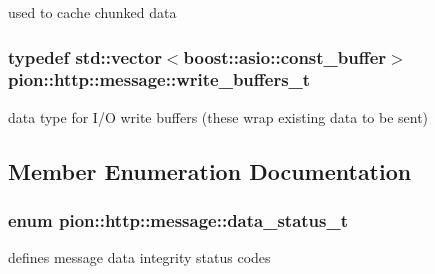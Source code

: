 used to cache chunked data 

\hypertarget{classpion_1_1http_1_1message_aacf9a6a7677c32e4ab764ac97d0b5e7b}{
\subsubsection[{write\-\_\-buffers\-\_\-t}]{\setlength{\rightskip}{0pt plus 5cm}typedef std\-::vector$<$boost\-::asio\-::const\-\_\-buffer$>$ {\bf pion\-::http\-::message\-::write\-\_\-buffers\-\_\-t}}}\label{classpion_1_1http_1_1message_aacf9a6a7677c32e4ab764ac97d0b5e7b}


data type for I/\-O write buffers (these wrap existing data to be sent) 



\subsection{Member Enumeration Documentation}
\hypertarget{classpion_1_1http_1_1message_ab71e06f72cacb4945dbf84663b0420e9}{
\subsubsection[{data\-\_\-status\-\_\-t}]{\setlength{\rightskip}{0pt plus 5cm}enum {\bf pion\-::http\-::message\-::data\-\_\-status\-\_\-t}}}\label{classpion_1_1http_1_1message_ab71e06f72cacb4945dbf84663b0420e9}


defines message data integrity status codes 

